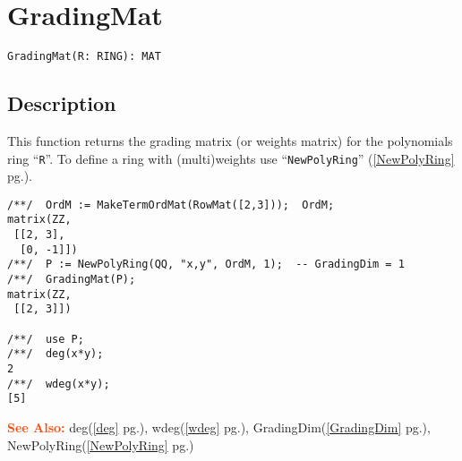 \documentclass[a4paper]{mybook}
\newenvironment{command}{}{} %
\newcommand\SeeAlso{\par\textcolor{OrangeRed}{\textbf{\large See Also: }}}
\begin{document}
\section{GradingMat}
\label{GradingMat}
\begin{command} %


\begin{Verbatim}[label=syntax, rulecolor=\color{MidnightBlue},
frame=single]
GradingMat(R: RING): MAT
\end{Verbatim}


\subsection*{Description}

This function returns the grading matrix (or weights matrix) for the
polynomials ring ``\verb&R&''.
To define a ring with (multi)weights use ``\verb&NewPolyRing&'' (\ref{NewPolyRing} pg.\pageref{NewPolyRing}).
\begin{Verbatim}[label=example, rulecolor=\color{PineGreen}, frame=single]
/**/  OrdM := MakeTermOrdMat(RowMat([2,3]));  OrdM;
matrix(ZZ,
 [[2, 3],
  [0, -1]])
/**/  P := NewPolyRing(QQ, "x,y", OrdM, 1);  -- GradingDim = 1
/**/  GradingMat(P);
matrix(ZZ,
 [[2, 3]])

/**/  use P;
/**/  deg(x*y);
2
/**/  wdeg(x*y);
[5]
\end{Verbatim}


\SeeAlso %
  deg(\ref{deg} pg.\pageref{deg}), 
    wdeg(\ref{wdeg} pg.\pageref{wdeg}), 
    GradingDim(\ref{GradingDim} pg.\pageref{GradingDim}), 
    NewPolyRing(\ref{NewPolyRing} pg.\pageref{NewPolyRing})
\end{command} %
\end{document}

